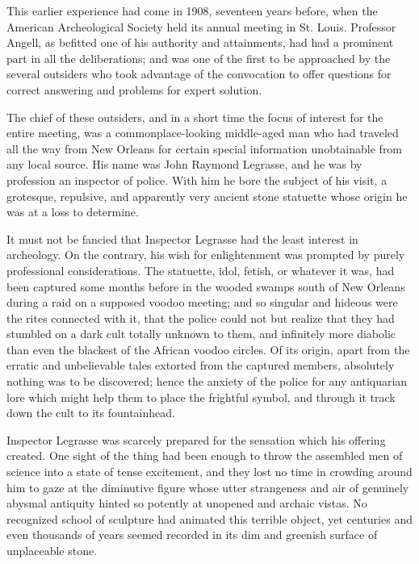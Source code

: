 This earlier experience had come in 1908, seventeen years before, when the American Archeological Society held its annual meeting in St. Louis. Professor Angell, as befitted one of his authority and attainments, had had a prominent part in all the deliberations; and was one of the first to be approached by the several outsiders who took advantage of the convocation to offer questions for correct answering and problems for expert solution.

The chief of these outsiders, and in a short time the focus of interest for the entire meeting, was a commonplace-looking middle-aged man who had traveled all the way from New Orleans for certain special information unobtainable from any local source. His name was John Raymond Legrasse, and he was by profession an inspector of police. With him he bore the subject of his visit, a grotesque, repulsive, and apparently very ancient stone statuette whose origin he was at a loss to determine.

It must not be fancied that Inspector Legrasse had the least interest in archeology. On the contrary, his wish for enlightenment was prompted by purely professional considerations. The statuette, idol, fetish, or whatever it was, had been captured some months before in the wooded swamps south of New Orleans during a raid on a supposed voodoo meeting; and so singular and hideous were the rites connected with it, that the police could not but realize that they had stumbled on a dark cult totally unknown to them, and infinitely more diabolic than even the blackest of the African voodoo circles. Of its origin, apart from the erratic and unbelievable tales extorted from the captured members, absolutely nothing was to be discovered; hence the anxiety of the police for any antiquarian lore which might help them to place the frightful symbol, and through it track down the cult to its fountainhead.

Inspector Legrasse was scarcely prepared for the sensation which his offering created. One sight of the thing had been enough to throw the assembled men of science into a state of tense excitement, and they lost no time in crowding around him to gaze at the diminutive figure whose utter strangeness and air of genuinely abysmal antiquity hinted so potently at unopened and archaic vistas. No recognized school of sculpture had animated this terrible object, yet centuries and even thousands of years seemed recorded in its dim and greenish surface of unplaceable stone.

